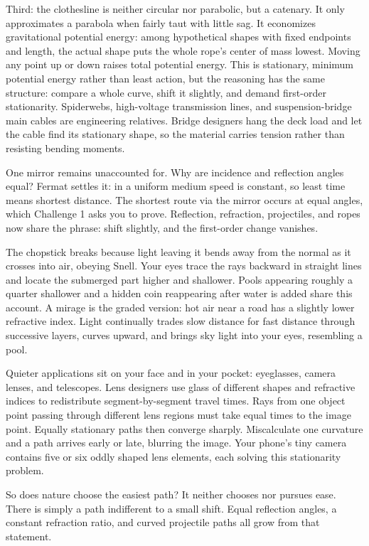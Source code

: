 Third: the clothesline is neither circular nor parabolic, but a catenary. It only approximates a parabola when fairly taut with little sag. It economizes gravitational potential energy: among hypothetical shapes with fixed endpoints and length, the actual shape puts the whole rope's center of mass lowest. Moving any point up or down raises total potential energy. This is stationary, minimum potential energy rather than least action, but the reasoning has the same structure: compare a whole curve, shift it slightly, and demand first-order stationarity. Spiderwebs, high-voltage transmission lines, and suspension-bridge main cables are engineering relatives. Bridge designers hang the deck load and let the cable find its stationary shape, so the material carries tension rather than resisting bending moments.

One mirror remains unaccounted for. Why are incidence and reflection angles equal? Fermat settles it: in a uniform medium speed is constant, so least time means shortest distance. The shortest route via the mirror occurs at equal angles, which Challenge 1 asks you to prove. Reflection, refraction, projectiles, and ropes now share the phrase: shift slightly, and the first-order change vanishes.

The chopstick breaks because light leaving it bends away from the normal as it crosses into air, obeying Snell. Your eyes trace the rays backward in straight lines and locate the submerged part higher and shallower. Pools appearing roughly a quarter shallower and a hidden coin reappearing after water is added share this account. A mirage is the graded version: hot air near a road has a slightly lower refractive index. Light continually trades slow distance for fast distance through successive layers, curves upward, and brings sky light into your eyes, resembling a pool.

Quieter applications sit on your face and in your pocket: eyeglasses, camera lenses, and telescopes. Lens designers use glass of different shapes and refractive indices to redistribute segment-by-segment travel times. Rays from one object point passing through different lens regions must take equal times to the image point. Equally stationary paths then converge sharply. Miscalculate one curvature and a path arrives early or late, blurring the image. Your phone's tiny camera contains five or six oddly shaped lens elements, each solving this stationarity problem.

So does nature choose the easiest path? It neither chooses nor pursues ease. There is simply a path indifferent to a small shift. Equal reflection angles, a constant refraction ratio, and curved projectile paths all grow from that statement.

